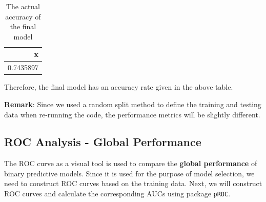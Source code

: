 \documentclass[
]{book}
\newenvironment{Shaded}{\begin{snugshade}}{\end{snugshade}}
\newcommand{\AttributeTok}[1]{\textcolor[rgb]{0.13,0.29,0.53}{#1}}
\newcommand{\FloatTok}[1]{\textcolor[rgb]{0.00,0.00,0.81}{#1}}
\newcommand{\FunctionTok}[1]{\textcolor[rgb]{0.13,0.29,0.53}{\textbf{#1}}}
\newcommand{\NormalTok}[1]{#1}
\newcommand{\OtherTok}[1]{\textcolor[rgb]{0.56,0.35,0.01}{#1}}
\newcommand{\SpecialCharTok}[1]{\textcolor[rgb]{0.81,0.36,0.00}{\textbf{#1}}}
\newcommand{\StringTok}[1]{\textcolor[rgb]{0.31,0.60,0.02}{#1}}
\begin{document}
\begin{Shaded}
\end{Shaded}

\begin{table}

\caption{\label{tab:unnamed-chunk-138}The actual accuracy of the final model}
\centering
\begin{tabular}[t]{r}
\hline
x\\
\hline
0.7435897\\
\hline
\end{tabular}
\end{table}

Therefore, the final model has an accuracy rate given in the above table.

\textbf{Remark}: Since we used a random split method to define the training and testing data when re-running the code, the performance metrics will be slightly different.

\hypertarget{roc-analysis---global-performance}{%
\subsection{ROC Analysis - Global Performance}\label{roc-analysis---global-performance}}

The ROC curve as a visual tool is used to compare the \textbf{global performance} of binary predictive models. Since it is used for the purpose of model selection, we need to construct ROC curves based on the training data. Next, we will construct ROC curves and calculate the corresponding AUCs using package \texttt{pROC}.
\end{document}
